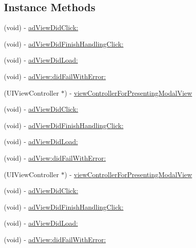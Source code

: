 \subsection*{Instance Methods}
\begin{DoxyCompactItemize}
\item 
(void) -\/ \hyperlink{protocolFBAdViewDelegate_01-p_a7842ffc41d5df660da7238e182ff634a}{ad\+View\+Did\+Click\+:}
\item 
(void) -\/ \hyperlink{protocolFBAdViewDelegate_01-p_a7fb041c26e7163226dfc7f2565c543b6}{ad\+View\+Did\+Finish\+Handling\+Click\+:}
\item 
(void) -\/ \hyperlink{protocolFBAdViewDelegate_01-p_a77334fc3e7bcc1f4ed61e1fbd372359a}{ad\+View\+Did\+Load\+:}
\item 
(void) -\/ \hyperlink{protocolFBAdViewDelegate_01-p_a2fc4eecd46ddc75a41e925c9b07d25b8}{ad\+View\+:did\+Fail\+With\+Error\+:}
\item 
(U\+I\+View\+Controller $\ast$) -\/ \hyperlink{protocolFBAdViewDelegate_01-p_abb65fb95527f0571d4a298beb1e6e299}{view\+Controller\+For\+Presenting\+Modal\+View}
\item 
(void) -\/ \hyperlink{protocolFBAdViewDelegate_01-p_a7842ffc41d5df660da7238e182ff634a}{ad\+View\+Did\+Click\+:}
\item 
(void) -\/ \hyperlink{protocolFBAdViewDelegate_01-p_a7fb041c26e7163226dfc7f2565c543b6}{ad\+View\+Did\+Finish\+Handling\+Click\+:}
\item 
(void) -\/ \hyperlink{protocolFBAdViewDelegate_01-p_a77334fc3e7bcc1f4ed61e1fbd372359a}{ad\+View\+Did\+Load\+:}
\item 
(void) -\/ \hyperlink{protocolFBAdViewDelegate_01-p_a2fc4eecd46ddc75a41e925c9b07d25b8}{ad\+View\+:did\+Fail\+With\+Error\+:}
\item 
(U\+I\+View\+Controller $\ast$) -\/ \hyperlink{protocolFBAdViewDelegate_01-p_abb65fb95527f0571d4a298beb1e6e299}{view\+Controller\+For\+Presenting\+Modal\+View}
\item 
(void) -\/ \hyperlink{protocolFBAdViewDelegate_01-p_a7842ffc41d5df660da7238e182ff634a}{ad\+View\+Did\+Click\+:}
\item 
(void) -\/ \hyperlink{protocolFBAdViewDelegate_01-p_a7fb041c26e7163226dfc7f2565c543b6}{ad\+View\+Did\+Finish\+Handling\+Click\+:}
\item 
(void) -\/ \hyperlink{protocolFBAdViewDelegate_01-p_a77334fc3e7bcc1f4ed61e1fbd372359a}{ad\+View\+Did\+Load\+:}
\item 
(void) -\/ \hyperlink{protocolFBAdViewDelegate_01-p_a2fc4eecd46ddc75a41e925c9b07d25b8}{ad\+View\+:did\+Fail\+With\+Error\+:}

\end{DoxyCompactItemize}
